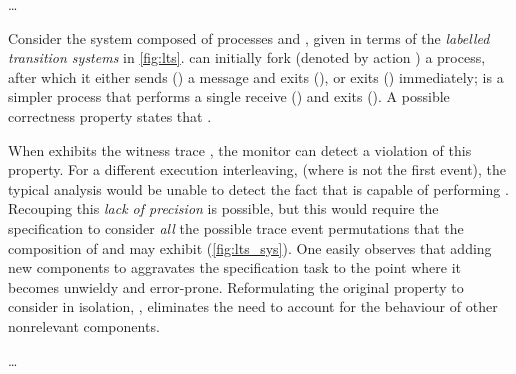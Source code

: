 \ldots
 
\begin{example}\label{eg:local}
  Consider the system \kSys composed of processes \kP and \kQ, given in terms of the \emph{labelled transition systems} in \cref{fig:lts}.
  \kP can initially fork (denoted by action ) a process, after which it either sends () a message and exits (), or exits () immediately; \kQ is a simpler process that performs a single receive () and exits ().
  A possible correctness property states that .

  \medskip
  When \kSys exhibits the witness trace , the monitor can detect a violation of this property.
  For a different execution interleaving, \eg {} (where  is not the first event), the typical \RV analysis would be unable to detect the fact that \kSys is capable of performing .
  Recouping this \emph{lack of precision} is possible, but this would require the specification to consider \emph{all} the possible trace event permutations that the composition of \kP and \kQ may exhibit (\cref{fig:lts_sys}). 
  One easily observes that adding new components to \kSys aggravates the specification task to the point where it becomes unwieldy and error-prone.
  Reformulating the original property to consider \kP in isolation, \ie {}, eliminates the need to account for the behaviour of other nonrelevant components.
\end{example}



\ldots

